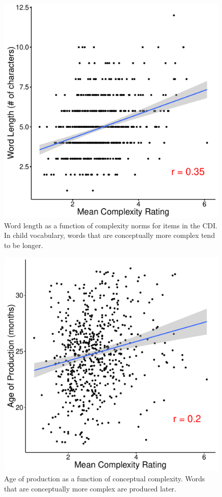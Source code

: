 \begin{figure}[t!]
\begin{center}
\includegraphics[scale = .5]{figs/chap4_3.pdf}
\end{center}
\caption{Word length as a function of complexity norms for items in the CDI. In child vocabulary, words that are conceptually more complex tend to be longer.}
\label{fig:study3}
\end{figure}

\begin{figure}[t!]
\begin{center}
\includegraphics[scale = .5]{figs/chap4_aoa.pdf}
\end{center}
\caption{Age of production as a function of conceptual complexity. Words that are conceptually more complex are produced later.}
\label{fig:study3aoa}
\end{figure}


